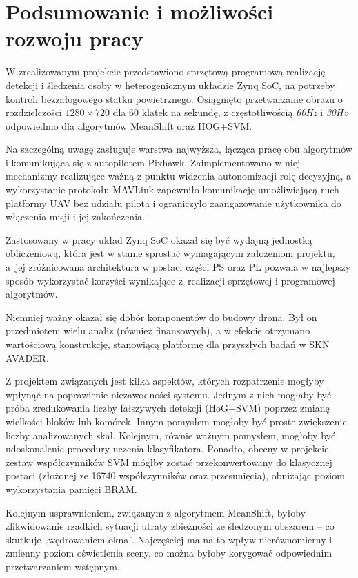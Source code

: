 \chapter{Podsumowanie i możliwości rozwoju pracy}

W zrealizowanym projekcie przedstawiono sprzętową-programową realizację detekcji i śledzenia osoby w heterogenicznym układzie Zynq SoC, na potrzeby kontroli bezzałogowego statku powietrznego. 
Osiągnięto przetwarzanie obrazu o rozdzielczości $1280\times 720$ dla 60 klatek na sekundę, z częstotliwością \textit{60Hz} i \textit{30Hz} odpowiednio dla algorytmów MeanShift oraz HOG+SVM.

Na szczególną uwagę zasługuje warstwa najwyższa, łącząca pracę obu algorytmów i komunikująca się z autopilotem Pixhawk. 
Zaimplementowano w niej mechanizmy realizujące ważną z punktu widzenia autonomizacji rolę decyzyjną, a wykorzystanie protokołu MAVLink zapewniło komunikację umożliwiającą ruch platformy UAV bez udziału pilota i ograniczyło zaangażowanie użytkownika do włączenia misji i jej zakończenia.

Zastosowany w pracy układ Zynq SoC okazał się być wydajną jednostką obliczeniową, która jest w stanie sprostać wymagającym założeniom projektu, a~jej zróżnicowana architektura w postaci części PS oraz PL pozwala w najlepszy sposób wykorzystać korzyści wynikające z~realizacji sprzętowej i programowej algorytmów.

Niemniej ważny okazał się dobór komponentów do budowy drona. Był on przedmiotem wielu analiz (również finansowych), a w efekcie otrzymano wartościową konstrukcję, stanowiącą platformę dla przyszłych badań w SKN AVADER.

Z projektem związanych jest kilka aspektów, których rozpatrzenie mogłyby wpłynąć na poprawienie niezawodności systemu. 
Jednym z nich mogłaby być próba zredukowania liczby fałszywych detekcji (HoG+SVM) poprzez zmianę wielkości bloków lub komórek. 
Innym pomysłem mogłoby być proste zwiększenie liczby analizowanych skal. 
Kolejnym, równie ważnym pomysłem, mogłoby być udoskonalenie procedury uczenia klasyfikatora. Ponadto, obecny w projekcie zestaw współczynników SVM mógłby zostać przekonwertowany do klasycznej postaci (złożonej ze 16740 współczynników oraz przesunięcia), obniżając poziom wykorzystania pamięci BRAM.

Kolejnym usprawnieniem, związanym z algorytmem MeanShift, byłoby zlikwidowanie rzadkich sytuacji utraty zbieżności ze śledzonym obszarem -- co skutkuje „wędrowaniem okna”. 
Najczęściej ma na to wpływ nierównomierny i zmienny poziom oświetlenia sceny, co można byłoby korygować odpowiednim przetwarzaniem wstępnym. 


